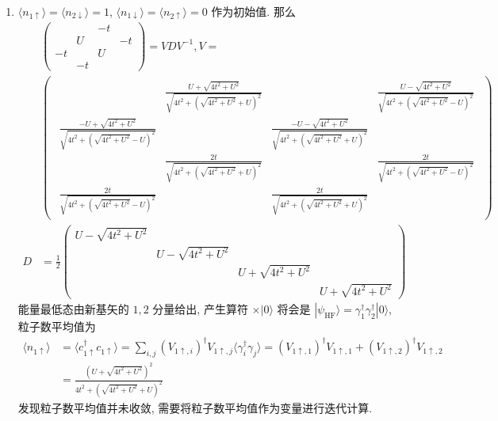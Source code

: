 \documentclass[../../main.tex]{subfiles}
\begin{document}
\begin{enumerate}
  \item $\langle n_{1\uparrow}\rangle = \langle n_{2\downarrow}\rangle = 1$, $\langle n_{1\downarrow}\rangle = \langle n_{2\uparrow}\rangle =0$ 作为初始值. 那么
  \begin{align*}
    &\begin{pmatrix}
        &  & -t & \\
        & U & & -t\\
        -t & & U &  \\
        & -t &  & 
    \end{pmatrix} = VDV^{-1},V = \\
&\begin{pmatrix}\begin{aligned}
 & \frac{U + \sqrt{4t^{2} + U^{2}}}{\sqrt{4t^{2} + (\sqrt{4t^{2} + U^{2}}+U)^{2}}} & & \frac{U -\sqrt{4t^{2} + U^{2}}}{\sqrt{4t^{2} + (\sqrt{4t^{2} + U^{2}}-U)^{2}}}\\
 \frac{-U + \sqrt{4t^{2} + U^{2}}}{\sqrt{4t^{2} + (\sqrt{4t^{2} + U^{2}}-U)^{2}}} & &\frac{-U - \sqrt{4t^{2} + U^{2}}}{\sqrt{4t^{2} + (\sqrt{4t^{2} + U^{2}}+U)^{2}}}&\\
 & \frac{2t}{\sqrt{4t^{2} + (\sqrt{4t^{2} + U^{2}}+U)^{2}}} & & \frac{2t}{\sqrt{4t^{2} + (\sqrt{4t^{2} + U^{2}}-U)^{2}}}\\
 \frac{2t}{\sqrt{4t^{2} + (\sqrt{4t^{2} + U^{2}}-U)^{2}}} & & \frac{2t}{\sqrt{4t^{2} + (\sqrt{4t^{2} + U^{2}}+U)^{2}}} &
\end{aligned}\end{pmatrix}\\
D &= \frac{1}{2}\begin{pmatrix}
  U - \sqrt{4t^{2} + U^{2}} &  & &\\
  & U - \sqrt{4t^{2} + U^{2}} & & \\
  && U + \sqrt{4t^{2} + U^{2}} & \\
  && & U + \sqrt{4t^{2} + U^{2}}
\end{pmatrix}
  \end{align*}
  能量最低态由新基矢的 $1,2$ 分量给出, 产生算符 $\times|0\rangle$ 将会是 $|\psi_{\text{HF}}\rangle = \gamma_{1}^{\dagger}\gamma_{2}^{\dagger}|0\rangle$, 粒子数平均值为
  \begin{align*}
    \langle n_{1\uparrow}\rangle &= \langle c_{1\uparrow}^{\dagger}c_{1\uparrow}\rangle = \sum_{i,j}(V_{1\uparrow,i})^{\dagger}V_{1\uparrow,j}\langle\gamma_{i}^{\dagger}\gamma_{j}\rangle =(V_{1\uparrow,1})^{\dagger}V_{1\uparrow,1} + (V_{1\uparrow,2})^{\dagger}V_{1\uparrow,2} \\
    &= \frac{(U + \sqrt{4t^{2} + U^{2}})^{2}}{4t^{2} + (\sqrt{4t^{2} + U^{2}} + U)^{2}}
  \end{align*}
  发现粒子数平均值并未收敛, 需要将粒子数平均值作为变量进行迭代计算.


\end{enumerate}
\end{document}
